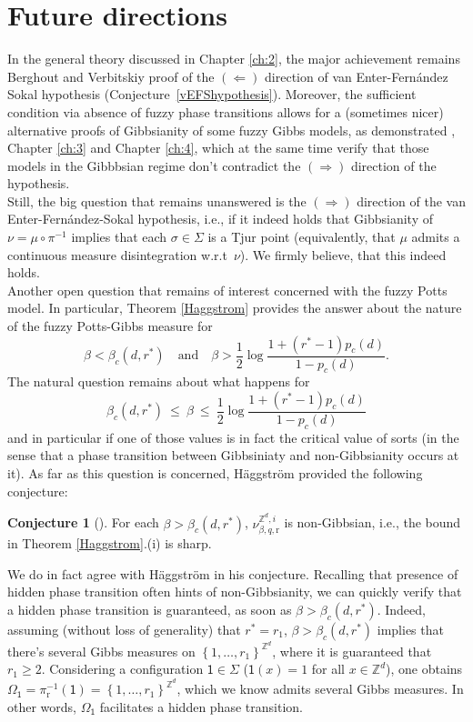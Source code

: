 \documentclass[12pt]{article}
\renewcommand{\r}{\mathrm{r}}
\newcommand{\Z}{\mathbb{Z}}
\newcommand{\set}[1]{\left\{#1\right\}}
\newcommand{\1}{\mathbbm{1}}
\newcommand{\5}{\vspace{0.5cm}}
\theoremstyle{definition}
\newtheorem{conj}[thm]{Conjecture}
\begin{document}
\section{Future directions}\label{ch:5}

In the general theory discussed in Chapter \ref{ch:2}, the major achievement remains Berghout and Verbitskiy proof of the $(\Leftarrow)$ direction of van Enter-Fern\'andez Sokal hypothesis (Conjecture~\ref{vEFShypothesis}). Moreover, the sufficient condition via absence of fuzzy phase transitions allows for a (sometimes nicer) alternative proofs of Gibbsianity of some fuzzy Gibbs models, as demonstrated \cite{Gas}, Chapter \ref{ch:3} and Chapter \ref{ch:4}, which at the same time verify that those models in the Gibbbsian regime don't contradict the $(\Rightarrow)$ direction of the hypothesis. \\

Still, the big question that remains unanswered is the $(\Rightarrow)$ direction of the van Enter-Fern\'andez-Sokal hypothesis, i.e., if it indeed holds that Gibbsianity of $\nu=\mu\circ\pi^{-1}$ implies that each $\sigma\in\Sigma$ is a Tjur point (equivalently, that $\mu$ admits a continuous measure disintegration w.r.t~$\nu$). We firmly believe, that this indeed holds. \\

Another open question that remains of interest concerned with the fuzzy Potts model. In particular, Theorem \ref{Haggstrom} provides the answer about the nature of the fuzzy Potts-Gibbs measure for
$$\beta < \beta_c(d,r^*) \quad \text{and} \quad \beta>\frac{1}{2}\log\frac{1+(r^*-1)p_c(d)}{1-p_c(d)}.$$
The natural question remains about what happens for
$$\beta_c(d,r^*) ~\leq~ \beta ~\leq~ \frac{1}{2}\log\frac{1+(r^*-1)p_c(d)}{1-p_c(d)}$$
and in particular if one of those values is in fact the critical value of sorts (in the sense that a phase transition between Gibbsiniaty and non-Gibbsianity occurs at it). As far as this question is concerned, H\"aggstr\"om provided the following conjecture:
\begin{conj}[\cite{Hag}]
For each $\beta>\beta_c(d,r^*)$, $\nu_{\beta,q,\r}^{\Z^d,i}$ is non-Gibbsian, i.e., the bound in Theorem \ref{Haggstrom}.(i) is sharp.
\end{conj}
We do in fact agree with H\"aggstr\"om in his conjecture. Recalling that presence of hidden phase transition often hints of non-Gibbsianity, we can quickly verify that a hidden phase transition is guaranteed, as soon as $\beta>\beta_c(d,r^*)$. Indeed, assuming (without loss of generality) that $r^*=r_1$, $\beta>\beta_c(d,r^*)$ implies that there's several Gibbs measures on $\set{1,\ldots,r_1}^{\Z^d}$, where it is guaranteed that $r_1\geq 2$. Considering a configuration $\mathsf{1}\in\Sigma$ ($\mathsf{1}(x)=1$ for all $x\in\Z^d$), one obtains $\Omega_{\mathsf{1}}=\pi_\r^{-1}(\mathsf{1})=\set{1,\ldots,r_1}^{\Z^d}$, which we know admits several Gibbs measures. In other words, $\Omega_{\mathsf{1}}$ facilitates a hidden phase transition. 
\end{document}
